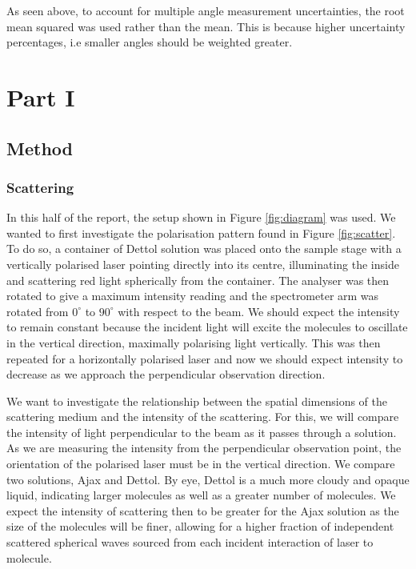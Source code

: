 \documentclass{article}
\begin{document}
As seen above, to account for multiple angle measurement uncertainties, the root mean squared was used 
rather than the mean. This is because higher uncertainty percentages, i.e smaller angles should be 
weighted greater.

\section{Part I}
\subsection{Method}
\subsubsection{Scattering}
In this half of the report, the setup shown in Figure \ref{fig:diagram} was used. We wanted to first 
investigate the polarisation pattern found in Figure \ref{fig:scatter}. To do so, a container of 
Dettol solution was placed onto the sample stage with a vertically polarised laser pointing directly 
into its centre, illuminating the inside and scattering red light spherically from the container. 
The analyser was then rotated to give a maximum intensity reading and the spectrometer arm was rotated
from $0^\circ$ to $90^\circ$ with respect to the beam. We should expect the intensity to remain 
constant because the incident light will excite the molecules to oscillate in the vertical direction,
maximally polarising light vertically. This was then repeated for a horizontally polarised laser 
and now we should expect intensity to decrease as we approach the perpendicular observation direction.

We want to investigate the relationship between the spatial dimensions of the scattering medium and 
the intensity of the scattering. For this, we will compare the intensity of light perpendicular to the 
beam as it passes through a solution. As we are measuring the intensity from the perpendicular observation 
point, the orientation of the polarised laser must be in the vertical direction. We compare two solutions, 
Ajax and Dettol. By eye, Dettol is a much more cloudy and opaque liquid, indicating larger molecules as 
well as a greater number of molecules. We expect the intensity of scattering then to be greater for the Ajax 
solution as the size of the molecules will be finer, allowing for a higher fraction of independent scattered 
spherical waves sourced from each incident interaction of laser to molecule.
\end{document}
